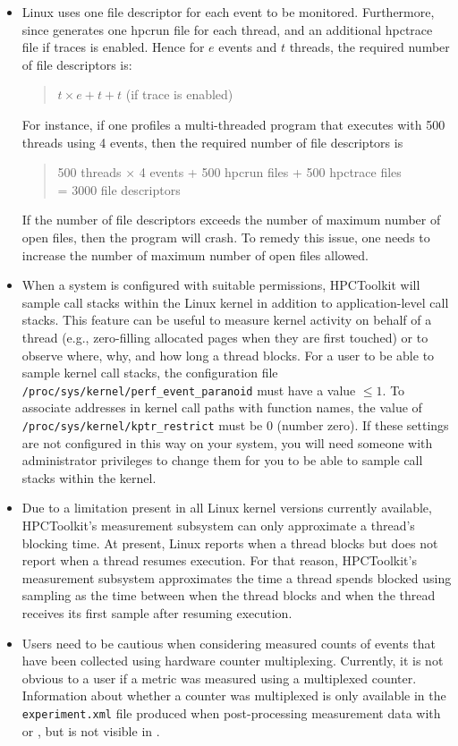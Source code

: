 \begin{itemize}
\item
Linux \perfevents{} uses one file descriptor for each event to be monitored. 
Furthermore, since \hpcrun{} generates one hpcrun file for each thread, and an additional hpctrace file if traces is enabled.
Hence for $e$ events and $t$ threads, the required number of file descriptors is: 
\begin{quote}
  $t \times e + t + t$ (if trace is enabled) 
\end{quote}
For instance, if one profiles a multi-threaded program that executes with 500 threads using 4 events, 
then the required number of file descriptors is
\begin{quote}
  500 threads $\times$ 4 events + 500 hpcrun files + 500 hpctrace files \\
  = 3000 file descriptors
\end{quote}
If the number of file descriptors exceeds the number of maximum number of open files, then the program will crash. 
To remedy this issue, one needs to increase the number of maximum number of open files allowed.

\item
\sloppy
When a system is configured with suitable permissions, HPCToolkit will sample call stacks
within the Linux kernel in addition to application-level call stacks. This feature can be useful to measure kernel activity on behalf of a thread (e.g., zero-filling allocated pages when they are first touched) 
or to observe where, why, and how long a thread blocks.
For a user to be able to sample kernel call stacks, the configuration file
\verb|/proc/sys/kernel/perf_event_paranoid| must have a value $\leq 1$.  To associate addresses
in kernel call paths with function names, the value of
\verb|/proc/sys/kernel/kptr_restrict| must be 0 (number zero). If these settings are not configured in this way on your system, you will need someone with administrator privileges to change them for you to 
be able to sample call stacks within the kernel.

\item
Due to a limitation present in all Linux kernel versions currently available,  
HPCToolkit's measurement subsystem can only approximate a thread's blocking time.
At present, Linux reports when a thread blocks but does not report when a thread resumes execution.
For that reason, HPCToolkit's measurement subsystem approximates the time a thread spends blocked using sampling as the time between when the thread blocks and when the thread receives its first sample
after resuming execution.


\item
Users need to be cautious when considering measured counts of events that have been collected using 
hardware counter multiplexing.  Currently, it is not obvious to a user
if a metric was measured using a multiplexed counter. Information about whether a counter was 
multiplexed is only available in the \verb|experiment.xml| file produced when post-processing measurement data with \hpcprof{} or \hpcprofmpi, but is not visible in \hpcviewer.
\end{itemize}

